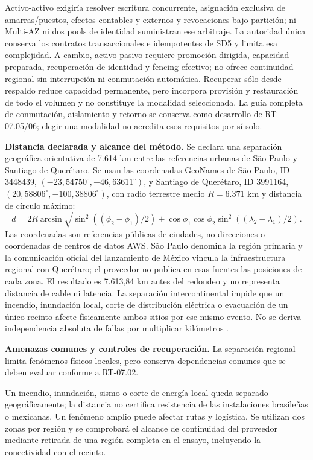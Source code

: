 Activo-activo exigiría resolver escritura concurrente, asignación exclusiva de amarras/puestos, efectos contables y externos y revocaciones bajo partición; ni Multi-AZ ni dos pools de identidad suministran ese arbitraje. La autoridad única conserva los contratos transaccionales e idempotentes de SD5 y limita esa complejidad. A cambio, activo-pasivo requiere promoción dirigida, capacidad preparada, recuperación de identidad y fencing efectivo; no ofrece continuidad regional sin interrupción ni conmutación automática. Recuperar sólo desde respaldo reduce capacidad permanente, pero incorpora provisión y restauración de todo el volumen y no constituye la modalidad seleccionada. La guía completa de conmutación, aislamiento y retorno se conserva como desarrollo de RT-07.05/06; elegir una modalidad no acredita esos requisitos por sí solo.

\textbf{Distancia declarada y alcance del método.}
\label{sec:sd4-dr-distancia}
Se declara una separación geográfica orientativa de 7.614 km entre las referencias urbanas de São Paulo y Santiago de Querétaro. Se usan las coordenadas GeoNames de São Paulo, ID 3448439, $(-23,54750^\circ,-46,63611^\circ)$, y Santiago de Querétaro, ID 3991164, $(20,58806^\circ,-100,38806^\circ)$, con radio terrestre medio $R=6.371$ km y distancia de círculo máximo:
\[
 d=2R\arcsin\sqrt{\sin^2((\phi_2-\phi_1)/2)+\cos\phi_1\cos\phi_2\sin^2((\lambda_2-\lambda_1)/2)}.
\]
Las coordenadas son referencias públicas de ciudades, no direcciones o coordenadas de centros de datos AWS. São Paulo denomina la región primaria y la comunicación oficial del lanzamiento de México vincula la infraestructura regional con Querétaro; el proveedor no publica en esas fuentes las posiciones de cada zona. El resultado es 7.613,84 km antes del redondeo y no representa distancia de cable ni latencia. La separación intercontinental impide que un incendio, inundación local, corte de distribución eléctrica o evacuación de un único recinto afecte físicamente ambos sitios por ese mismo evento. No se deriva independencia absoluta de fallas por multiplicar kilómetros \parencites{l14-geonames-sp,l14-geonames-qro,l14-aws-mexico}.

\textbf{Amenazas comunes y controles de recuperación.} La separación regional limita fenómenos físicos locales, pero conserva dependencias comunes que se deben evaluar conforme a RT-07.02.

Un incendio, inundación, sismo o corte de energía local queda separado geográficamente; la distancia no certifica resistencia de las instalaciones brasileñas o mexicanas. Un fenómeno amplio puede afectar rutas y logística. Se utilizan dos zonas por región y se comprobará el alcance de continuidad del proveedor mediante retirada de una región completa en el ensayo, incluyendo la conectividad con el recinto.

